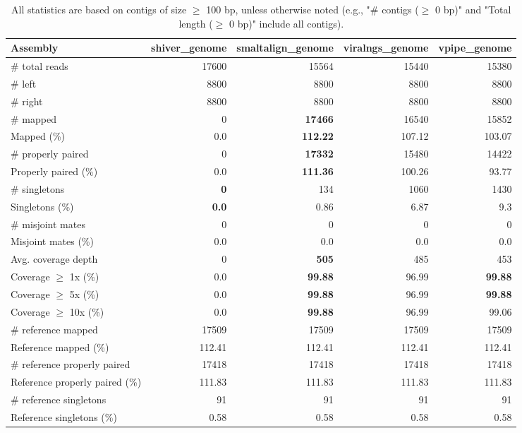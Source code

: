 \documentclass[12pt,a4paper]{article}
\begin{document}
\begin{table}[ht]
\begin{center}
\caption{All statistics are based on contigs of size $\geq$ 100 bp, unless otherwise noted (e.g., "\# contigs ($\geq$ 0 bp)" and "Total length ($\geq$ 0 bp)" include all contigs).}
\begin{tabular}{|l*{4}{|r}|}
\hline
Assembly & shiver\_genome & smaltalign\_genome & viralngs\_genome & vpipe\_genome \\ \hline
\# total reads & 17600 & 15564 & 15440 & 15380 \\ \hline
\# left & 8800 & 8800 & 8800 & 8800 \\ \hline
\# right & 8800 & 8800 & 8800 & 8800 \\ \hline
\# mapped & 0 & {\bf 17466} & 16540 & 15852 \\ \hline
Mapped (\%) & 0.0 & {\bf 112.22} & 107.12 & 103.07 \\ \hline
\# properly paired & 0 & {\bf 17332} & 15480 & 14422 \\ \hline
Properly paired (\%) & 0.0 & {\bf 111.36} & 100.26 & 93.77 \\ \hline
\# singletons & {\bf 0} & 134 & 1060 & 1430 \\ \hline
Singletons (\%) & {\bf 0.0} & 0.86 & 6.87 & 9.3 \\ \hline
\# misjoint mates & 0 & 0 & 0 & 0 \\ \hline
Misjoint mates (\%) & 0.0 & 0.0 & 0.0 & 0.0 \\ \hline
Avg. coverage depth & 0 & {\bf 505} & 485 & 453 \\ \hline
Coverage $\geq$ 1x (\%) & 0.0 & {\bf 99.88} & 96.99 & {\bf 99.88} \\ \hline
Coverage $\geq$ 5x (\%) & 0.0 & {\bf 99.88} & 96.99 & {\bf 99.88} \\ \hline
Coverage $\geq$ 10x (\%) & 0.0 & {\bf 99.88} & 96.99 & 99.06 \\ \hline
\# reference mapped & 17509 & 17509 & 17509 & 17509 \\ \hline
Reference mapped (\%) & 112.41 & 112.41 & 112.41 & 112.41 \\ \hline
\# reference properly paired & 17418 & 17418 & 17418 & 17418 \\ \hline
Reference properly paired (\%) & 111.83 & 111.83 & 111.83 & 111.83 \\ \hline
\# reference singletons & 91 & 91 & 91 & 91 \\ \hline
Reference singletons (\%) & 0.58 & 0.58 & 0.58 & 0.58 \\ \hline

\end{tabular}
\end{center}
\end{table}
\end{document}
